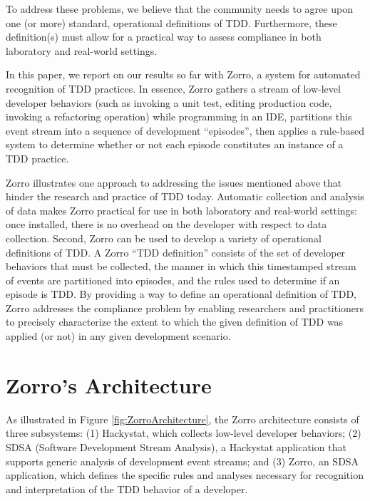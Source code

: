 \documentclass[11pt,twocolumn]{article}
\begin{document}
To address these problems, we believe that the community needs to agree
upon one (or more) standard, operational definitions of TDD. Furthermore,
these definition(s) must allow for a practical way to assess compliance in
both laboratory and real-world settings.

In this paper, we report on our results so far with Zorro, a system for
automated recognition of TDD practices.  In essence, Zorro gathers a stream
of low-level developer behaviors (such as invoking a unit test, editing
production code, invoking a refactoring operation) while programming in an
IDE, partitions this event stream into a sequence of development
``episodes'', then applies a rule-based system to determine whether or 
not each episode constitutes an instance of a TDD practice. 

Zorro illustrates one approach to addressing the 
issues mentioned above that hinder the research and practice of TDD today.
Automatic collection and analysis of data makes Zorro practical for use in
both laboratory and real-world settings: once installed, there is no
overhead on the developer with respect to data collection.  Second, Zorro
can be used to develop a variety of operational definitions
of TDD. A Zorro ``TDD definition'' consists of the set of developer behaviors
that must be collected, the manner in which this timestamped stream of
events are partitioned into episodes, and the rules used to determine if an
episode is TDD.  By providing a way to define an operational definition of
TDD, Zorro addresses the compliance problem by enabling researchers and
practitioners to precisely characterize the extent to which the given
definition of TDD was applied (or not) in any given development scenario.

\section{Zorro's Architecture}
\label{sec:sdsa}

As illustrated in Figure \ref{fig:ZorroArchitecture}, the Zorro
architecture consists of three subsystems: (1) Hackystat, which collects
low-level developer behaviors; (2) SDSA (Software Development Stream
Analysis), a Hackystat application that supports generic analysis of
development event streams; and (3) Zorro, an SDSA application, which
defines the specific rules and analyses necessary for recognition and
interpretation of the TDD behavior of a developer.
\end{document}
